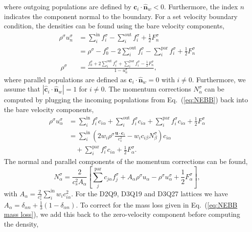 \documentclass[aps,physrev,twocolumn,10pt]{revtex4-2}
\begin{document}
where outgoing populations are defined by $\bm{c}_i \cdot \hat{\bm{n}}_w < 0$. Furthermore, the index $n$ indicates the component normal to the boundary. For a set velocity boundary condition, the densities can be found using the bare velocity components, 
\begin{equation}
\begin{split}
    \rho^\sigma u_n^\sigma &= \sum_i^\text{in} f_i^\sigma - \sum_i^\text{out} f_i^\sigma + \frac{1}{2}F_n^\sigma\\
    &= \rho^\sigma - f_0^\sigma - 2\sum_i^\text{out}f_i^\sigma - \sum_i^\text{par}f_i^\sigma + \frac{1}{2}F_n^\sigma\\\
    \rho^\sigma &= \frac{f_0^\sigma + 2\sum_i^\text{out}f_i^\sigma + \sum_i^\text{par}f_i^\sigma - \frac{1}{2}F_n^\sigma}{1 - u_n^\sigma},
\end{split}
\end{equation}
where parallel populations are defined as $\bm{c}_i \cdot \hat{\bm{n}}_w = 0$ with $i\neq0$. Furthermore, we assume that $|\hat{\bm{c}}_i\cdot\hat{\bm{n}}_w| = 1$ for $i \neq 0$. The momentum corrections $N_\alpha^\sigma$ can be computed by plugging the incoming populations from Eq.~(\ref{eq:NEBB}) back into the bare velocity components,
\begin{equation}
\begin{split}
    \rho^\sigma u^\sigma_{\alpha} &= \sum_i^\text{in} f_i^\sigma c_{i\alpha} + \sum_i^\text{out} f_i^\sigma c_{i\alpha} + \sum_i^\text{par} f_i^\sigma c_{i\alpha} + \frac{1}{2}F^\sigma_{\alpha}\\
    &= \sum_i^\text{in} \left(2w_i \rho^\sigma \frac{\bm{u} \cdot \bm{c}_i}{c_s^2} -  w_i c_{i\beta} N_\beta^\sigma\right)c_{i\alpha} \\
    &\quad+ \sum_i^\text{par}f_i^\sigma c_{i\alpha} + \frac{1}{2}F^\sigma_\alpha.
\end{split}
\end{equation}
The normal and parallel components of the momentum corrections can be found,
\begin{equation}
    N_\alpha^\sigma = \frac{2}{c_s^2 A_\alpha}\left[\sum_j^\text{par}c_{j\alpha}f_j^\sigma + A_\alpha\rho^\sigma u_\alpha - \rho^\sigma u^\sigma_\alpha+ \frac{1}{2}F_\alpha^\sigma\right],
\end{equation}
with $A_\alpha = \frac{2}{c_s^2}\sum_i^\text{in} w_i c_{i\alpha}^2$. For the D2Q9, D3Q19 and D3Q27 lattices we have $A_\alpha = \delta_{\alpha n} + \frac{1}{3}(1 - \delta_{\alpha n})$. To correct for the mass loss given in Eq.~(\ref{eq:NEBB mass loss}), we add this back to the zero-velocity component before computing the density,
\end{document}
